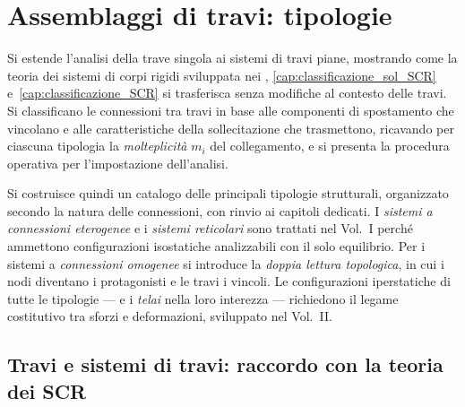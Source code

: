 \graphicspath{{Parti/P04-Travi_rigide/C03-Assemblaggi_travi/Figure/}}
\chapter{Assemblaggi di travi: tipologie}
\label{cap:assemblaggi_travi}

\begin{sommario}
	Si estende l'analisi della trave singola ai sistemi
	di travi piane, mostrando come la teoria dei sistemi
	di corpi rigidi sviluppata nei
	,
	\ref{cap:classificazione_sol_SCR}
	e~\ref{cap:classificazione_SCR}
	si trasferisca senza modifiche al contesto delle travi.
	Si classificano le connessioni tra travi in base alle
	componenti di spostamento che vincolano e alle
	caratteristiche della sollecitazione che trasmettono,
	ricavando per ciascuna tipologia la \emph{molteplicità}
	$m_i$ del collegamento, e si presenta la procedura
	operativa per l'impostazione dell'analisi.
	
	Si costruisce quindi un catalogo delle principali
	tipologie strutturali, organizzato secondo la natura
	delle connessioni, con rinvio ai capitoli dedicati.
	I \emph{sistemi a connessioni eterogenee} e i
	\emph{sistemi reticolari} sono trattati nel
	Vol.~I perché ammettono configurazioni isostatiche
	analizzabili con il solo equilibrio. Per i sistemi
	a \emph{connessioni omogenee} si introduce la
	\emph{doppia lettura topologica}, in cui i nodi
	diventano i protagonisti e le travi i vincoli.
	Le configurazioni iperstatiche di tutte le tipologie
	--- e i \emph{telai} nella loro interezza ---
	richiedono il legame costitutivo tra sforzi e
	deformazioni, sviluppato nel Vol.~II.
\end{sommario}


\section{Travi e sistemi di travi: raccordo con la teoria
	dei SCR}
\label{sec:raccordo_SCR}

